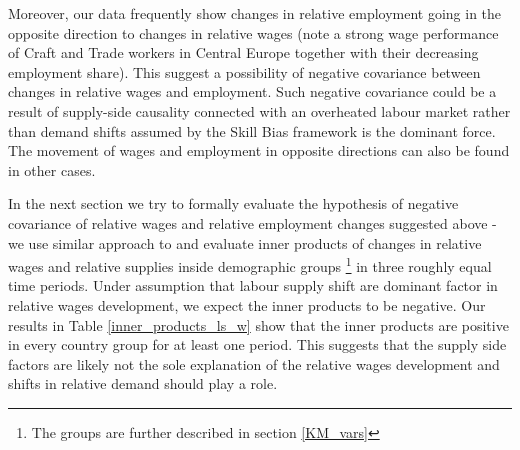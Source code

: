 \documentclass[11pt]{article}
\begin{document}
Moreover, our data frequently show changes in relative employment going in the opposite direction to changes in relative wages (note a strong wage performance of Craft and Trade workers in Central Europe together with their decreasing employment share). This suggest a possibility of negative covariance between changes in relative wages and employment. Such negative covariance could be a result of supply-side causality connected with an overheated labour market rather than demand shifts assumed by the Skill Bias framework is the dominant force. The movement of wages and employment in opposite directions can also be found in other cases.


In the next section we try to formally evaluate the hypothesis of negative covariance of relative wages and relative employment changes suggested above - we use similar approach to \citet{katz1992changes} and evaluate inner products of changes in relative wages and relative supplies inside demographic groups \footnote{The groups are further described in section \ref{KM_vars}} in three roughly equal time periods. Under assumption that labour supply shift are dominant factor in relative wages development, we expect the inner products to be negative. Our results in Table \ref{inner_products_ls_w} show that the inner products are positive in every country group for at least one period. This suggests that the supply side factors are likely not the sole explanation of the relative wages development and shifts in relative demand should play a role. 
\end{document}
